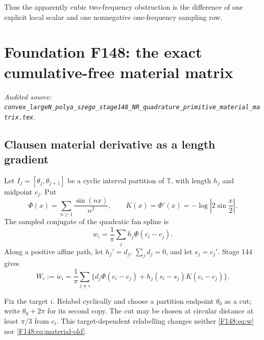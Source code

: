 \documentclass[11pt]{amsart}
\numberwithin{equation}{section}
\theoremstyle{definition}
\theoremstyle{remark}
\newcommand{\T}{\mathbb T}
\begin{document}
Thus the apparently cubic two-frequency obstruction is the difference of
one explicit local scalar and one nonnegative one-frequency sampling row.
\endgroup

\begingroup
\section{Foundation F148: the exact cumulative-free material matrix}
\label{module:F148}
\noindent\textit{Audited source: \nolinkurl{convex_largeN_polya_szego_stage148_NR_quadrature_primitive_material_matrix.tex}.}
\subsection{Clausen material derivative as a length gradient}

Let $I_j=[\theta_j,\theta_{j+1}]$ be a cyclic interval partition of
$\T$, with length $h_j$ and midpoint $c_j$.  Put
\begin{equation}\label{F148:eq:clausen}
 \Phi(x)=\sum_{n\ge1}\frac{\sin(nx)}{n^2},\qquad
 K(x)=\Phi'(x)=-\log\left|2\sin\frac x2\right|.
\end{equation}
The sampled conjugate of the quadratic fan spline is
\begin{equation}\label{F148:eq:w}
 w_i=\frac1\pi\sum_jh_j\Phi(c_i-c_j).
\end{equation}
Along a positive affine path, let $h_j'=d_j$, $\sum_jd_j=0$, and let
$s_j=c_j'$.  Stage 144 gives
\begin{equation}\label{F148:eq:material-old}
 W_i:=\dot w_i=\frac1\pi\sum_{j\ne i}
 \{d_j\Phi(c_i-c_j)+h_j(s_i-s_j)K(c_i-c_j)\}.
\end{equation}

Fix the target $i$.  Relabel cyclically and choose a partition endpoint
$\theta_0$ as a cut; write $\theta_0+2\pi$ for its second copy.  The cut
may be chosen at circular distance at least $\pi/3$ from $c_i$.  This
target-dependent relabelling changes neither \eqref{F148:eq:w} nor
\eqref{F148:eq:material-old}.
\end{document}
